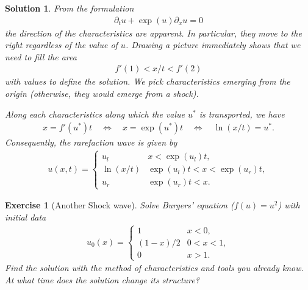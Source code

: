 \documentclass[10pt,letterpaper]{article}
\theoremstyle{break}
\newtheorem{exercise}{Exercise}
\newtheorem{mysolution}{Solution}
\newenvironment{solution}{\begin{mysolution}}{\end{mysolution}}
\begin{document}
\begin{solution}
    From the formulation 
    \begin{align}
     \partial_t u + \exp(u) \partial_x u = 0
    \end{align}
    the direction of the characteristics are apparent. 
    In particular, they move to the right regardless of the value of $u$. 
    Drawing a picture immediately shows that we need to fill the area 
    \begin{align}
     f'(1) < x/t < f'(2)
    \end{align}
    with values to define the solution. 
    We pick characteristics emerging from the origin (otherwise, they would emerge from a shock).
    
    Along each characteristics along which the value $u^{\ast}$ is transported, we have 
    \begin{align}
     x = f'(u^{\ast}) t
     \quad\Longleftrightarrow\quad
     x = \exp(u^{\ast}) t
     \quad\Longleftrightarrow\quad
     \ln(x/t) = u^{\ast}
     .
    \end{align}
    Consequently, the rarefaction wave is given by 
    \begin{align}
     u(x,t)
     = 
     \left\{
     \begin{array}{ll}
        u_l & x < \exp(u_l) t,
        \\
        \ln(x/t) & \exp(u_l)t < x < \exp(u_r)t,
        \\
        u_r & \exp(u_r)t < x.
     \end{array}
     \right.
    \end{align}
\end{solution}






\begin{exercise}[Another Shock wave]
    Solve Burgers' equation ($f(u)=u^2$) with initial data 
    \begin{align}
     u_{0}(x)
     = 
     \left\{
     \begin{array}{cc}
        1 & x < 0,
        \\
        (1-x)/2 & 0 < x < 1,
        \\
        0 & x > 1.
     \end{array}
     \right.
    \end{align}
    Find the solution with the method of characteristics and tools you already know.
    At what time does the solution change its structure? 
\end{exercise}
\end{document}
